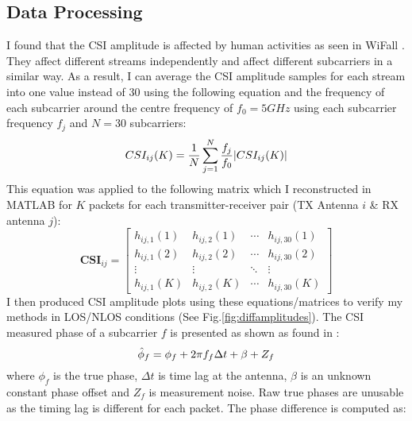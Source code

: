 \subsection{Data Processing}
I found that the CSI amplitude is affected by human activities as seen in WiFall \citep{WiFall}. They affect different streams independently and affect different subcarriers in a similar way. As a result, I can average the CSI amplitude samples for each stream into one value instead of 30 using the following equation and the frequency of each subcarrier around the centre frequency of $f_0 = 5GHz$ using each subcarrier frequency $f_j$ and $N=30$ subcarriers: 
\vspace{-11pt}
\begin{equation}\label{eqn:3.1}
    CSI_{ij}(K) = \frac{1}{N} \sum_{j=1}^{N} \frac{f_j}{f_0} |CSI_{ij}(K)|
    \vspace{-11pt}
\end{equation}
This equation was applied to the following matrix which I reconstructed in MATLAB for $K$ packets for each transmitter-receiver pair (TX Antenna $i$ \& RX antenna $j$):
\begin{equation}\label{eqn:3.2}
\textbf{CSI}_{ij}=\left[
\begin{array}{cccc}
    h_{ij,1}(1) & h_{ij,2}(1) & \cdots & h_{ij,30}(1) \\
    h_{ij,1}(2) & h_{ij,2}(2) & \cdots & h_{ij,30}(2) \\
   \vdots & \vdots & \ddots & \vdots \\
    h_{ij,1}(K) & h_{ij,2}(K) & \cdots & h_{ij,30}(K) 
\end{array}
\right]
\end{equation}
I then produced CSI amplitude plots using these equations/matrices to verify my methods in LOS/NLOS conditions (See Fig.\ref{fig:diffamplitudes}). The CSI measured phase of a subcarrier $f$ is presented as shown as found in \cite{MonaLisaSpotFi}:
\vspace{-11pt}
\begin{equation}\label{eqn:3.3}
    \hat{\phi}_f = \phi_{f}+2\pi f_{f}\Delta t + \beta + Z_f
    \vspace{-11pt}
\end{equation}
where $\phi_{f}$ is the true phase, $\Delta t$ is time lag at the antenna, $\beta$ is an unknown constant phase offset and $Z_f$ is measurement noise. Raw true phases are unusable as the timing lag is different for each packet. The phase difference is computed as:
